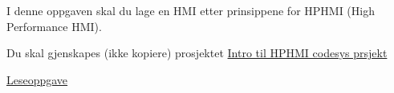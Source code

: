 

\noindent

\vskip 5pt



I denne oppgaven skal du lage en HMI etter prinsippene for HPHMI (High Performance HMI).

\vskip 5pt 
Du skal gjenskapes (ikke kopiere) prosjektet \href{https://rfka-my.sharepoint.com/:u:/g/personal/fred-olav_mosdal_skole_rogfk_no/EbxoQUSK9jxFkJX9XfhvLoMBomsgt_JP02XtAeb4RRNFrA?e=ZfVSqa}{Intro til HPHMI codesys prsjekt}
\vskip 5pt 

\vskip 5pt 



\vskip 5pt 
\href{https://rfka-my.sharepoint.com/:b:/g/personal/fred-olav_mosdal_skole_rogfk_no/EbDgASyqKH5Ni0i6BCYnE04BaRvhWzEjRBcZw8CqgX0Mfw?e=e0zKzU}{Leseoppgave}



















